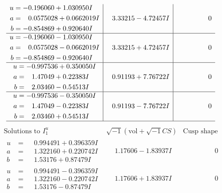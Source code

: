 \documentclass[1p]{elsarticle_modified}
\theoremstyle{definition}
\newcommand{\I}{\sqrt{-1}}
\begin{document}
$$\begin{array}{c|c|c}
\begin{aligned}
u &= -0.196060 + 1.030950 I \\
a &= \phantom{-}0.0575028 + 0.0662019 I \\
b &= -0.854869 + 0.920640 I\end{aligned}
 & \phantom{-}3.33215 - 4.72457 I & \phantom{-0.000000 } 0 \\ \hline\begin{aligned}
u &= -0.196060 - 1.030950 I \\
a &= \phantom{-}0.0575028 - 0.0662019 I \\
b &= -0.854869 - 0.920640 I\end{aligned}
 & \phantom{-}3.33215 + 4.72457 I & \phantom{-0.000000 } 0 \\ \hline\begin{aligned}
u &= -0.997536 + 0.350050 I \\
a &= \phantom{-}1.47049 + 0.22383 I \\
b &= \phantom{-}2.03460 - 0.54513 I\end{aligned}
 & \phantom{-}0.91193 + 7.76722 I & \phantom{-0.000000 } 0 \\ \hline\begin{aligned}
u &= -0.997536 - 0.350050 I \\
a &= \phantom{-}1.47049 - 0.22383 I \\
b &= \phantom{-}2.03460 + 0.54513 I\end{aligned}
 & \phantom{-}0.91193 - 7.76722 I & \phantom{-0.000000 } 0\\
 \hline 
 \end{array}$$\newpage$$\begin{array}{c|c|c}  
\text{Solutions to }I^u_{1}& \I (\text{vol} + \sqrt{-1}CS) & \text{Cusp shape}\\
 \hline 
\begin{aligned}
u &= \phantom{-}0.994491 + 0.396359 I \\
a &= \phantom{-}1.322160 + 0.220742 I \\
b &= \phantom{-}1.53176 + 0.87479 I\end{aligned}
 & \phantom{-}1.17606 - 1.83937 I & \phantom{-0.000000 } 0 \\ \hline\begin{aligned}
u &= \phantom{-}0.994491 - 0.396359 I \\
a &= \phantom{-}1.322160 - 0.220742 I \\
b &= \phantom{-}1.53176 - 0.87479 I\end{aligned}
 & \phantom{-}1.17606 + 1.83937 I & \phantom{-0.000000 } 0 \\ \hline\begin{aligned}

\end{aligned}
\end{array}$$
\end{document}

